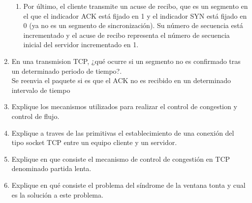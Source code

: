 \documentclass{udparticle}
\begin{document}
\begin{enumerate}
\begin{enumerate}
\item Por último, el cliente transmite un acuse de recibo, que es un segmento en el que el indicador ACK está fijado en 1 y el indicador SYN está fijado en 0 (ya no es un segmento de sincronización). Su número de secuencia está incrementado y el acuse de recibo representa el número de secuencia inicial del servidor incrementado en 1.
\end{enumerate}

\item En una transmision TCP, ¿qué ocurre si un segmento no es 
confirmado tras un determinado periodo de tiempo?.\\
Se reenvia el paquete si es que el ACK no es recibido en un determinado intervalo de tiempo
\item Explique los mecanismos utilizados para realizar el control de 
congestion y control de flujo.
\item Explique a traves de las primitivas el establecimiento de una 
conexión del tipo socket TCP entre un equipo cliente y un servidor.
\item Explique en que consiste el mecanismo de control de congestión en
TCP denominado partida lenta.
\item Explique en qué consiste el problema del síndrome de la ventana 
tonta y cual es la solución a este problema.
\end{enumerate}
\end{document}
